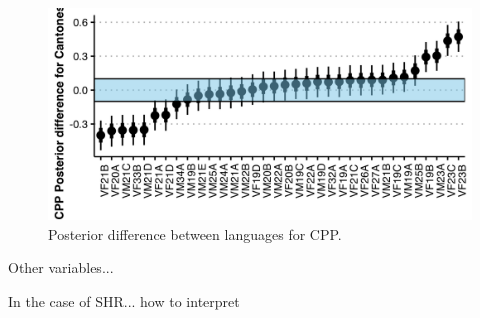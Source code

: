 \begin{figure}[htbp]
    \begin{center}
    \includegraphics[width=\linewidth]{figures/ch3_cpp_5in.png} 
    \caption{Posterior difference between languages for CPP.}
    \label{ch3:fig:cpp}
    \end{center}
\end{figure}

Other variables...

In the case of SHR... how to interpret
    



